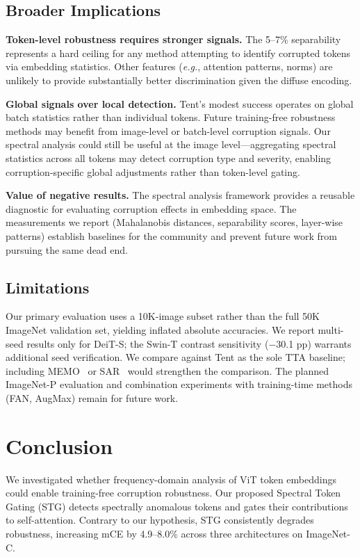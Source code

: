 \documentclass{article}
\newcommand{\methodname}{STG}
\newcommand{\eg}{\emph{e.g.}}
\begin{document}
\subsection{Broader Implications}

\textbf{Token-level robustness requires stronger signals.} The 5--7\% separability represents a hard ceiling for any method attempting to identify corrupted tokens via embedding statistics. Other features (\eg, attention patterns, norms) are unlikely to provide substantially better discrimination given the diffuse encoding.

\textbf{Global signals over local detection.} Tent's modest success operates on global batch statistics rather than individual tokens. Future training-free robustness methods may benefit from image-level or batch-level corruption signals. Our spectral analysis could still be useful at the image level---aggregating spectral statistics across all tokens may detect corruption type and severity, enabling corruption-specific global adjustments rather than token-level gating.

\textbf{Value of negative results.} The spectral analysis framework provides a reusable diagnostic for evaluating corruption effects in embedding space. The measurements we report (Mahalanobis distances, separability scores, layer-wise patterns) establish baselines for the community and prevent future work from pursuing the same dead end.

\subsection{Limitations}

Our primary evaluation uses a 10K-image subset rather than the full 50K ImageNet validation set, yielding inflated absolute accuracies. We report multi-seed results only for DeiT-S; the Swin-T contrast sensitivity ($-$30.1 pp) warrants additional seed verification. We compare against Tent as the sole TTA baseline; including MEMO~\citep{zhang2022memo} or SAR~\citep{niu2023towards} would strengthen the comparison. The planned ImageNet-P evaluation and combination experiments with training-time methods (FAN, AugMax) remain for future work.

\section{Conclusion}
\label{sec:conclusion}

We investigated whether frequency-domain analysis of ViT token embeddings could enable training-free corruption robustness. Our proposed Spectral Token Gating (\methodname{}) detects spectrally anomalous tokens and gates their contributions to self-attention. Contrary to our hypothesis, \methodname{} consistently degrades robustness, increasing mCE by 4.9--8.0\% across three architectures on ImageNet-C.
\end{document}
